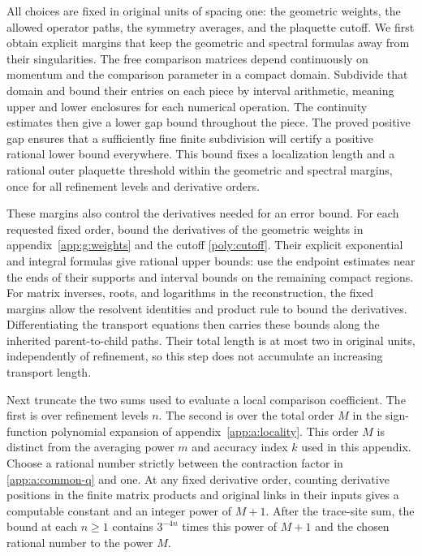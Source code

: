 \documentclass[11pt,a4paper]{article}
\theoremstyle{remark}
\begin{document}
All choices are fixed in original units of spacing one: the geometric
weights, the allowed operator paths, the symmetry averages, and the
plaquette cutoff. We first obtain explicit margins that keep the
geometric and spectral formulas away from their singularities. The
free comparison matrices depend continuously on momentum and the
comparison parameter in a compact domain. Subdivide that domain and
bound their entries on each piece by interval arithmetic, meaning
upper and lower enclosures for each numerical operation. The continuity
estimates then give a lower gap bound throughout the piece. The proved
positive gap ensures that a sufficiently fine finite subdivision will
certify a positive rational lower bound everywhere. This bound fixes
a localization length and a rational outer plaquette threshold within
the geometric and spectral margins, once for all refinement levels
and derivative orders.

These margins also control the derivatives needed for an error bound.
For each requested fixed order, bound the derivatives of the geometric
weights in appendix~\ref{app:g:weights} and the cutoff
\eqref{poly:cutoff}. Their explicit exponential and integral formulas
give rational upper bounds: use the endpoint estimates near the ends
of their supports and interval bounds on the remaining compact regions.
For matrix inverses, roots, and logarithms in the reconstruction, the
fixed margins allow the resolvent identities and product rule to bound
the derivatives. Differentiating the transport equations then carries
these bounds along the inherited parent-to-child paths. Their total
length is at most two in original units, independently of refinement,
so this step does not accumulate an increasing transport length.

Next truncate the two sums used to evaluate a local comparison
coefficient. The first is over refinement levels $n$. The second is
over the total order $M$ in the sign-function polynomial expansion of
appendix~\ref{app:a:locality}. This order $M$ is distinct from the
averaging power $m$ and accuracy index $k$ used in this appendix.
Choose a rational number strictly between the contraction factor in
\eqref{app:a:common-q} and one. At any fixed derivative order, counting
derivative positions in the finite matrix products and original links
in their inputs gives a computable constant and an integer power of
$M+1$. After the trace-site sum, the bound at each $n\ge1$ contains
$3^{-4n}$ times this power of $M+1$ and the chosen rational number
to the power $M$.
\end{document}
